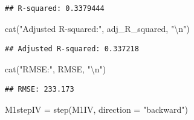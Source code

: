 \documentclass[
]{article}
\newenvironment{Shaded}{\begin{snugshade}}{\end{snugshade}}
\newcommand{\AttributeTok}[1]{\textcolor[rgb]{0.77,0.63,0.00}{#1}}
\newcommand{\FunctionTok}[1]{\textcolor[rgb]{0.00,0.00,0.00}{#1}}
\newcommand{\NormalTok}[1]{#1}
\newcommand{\OtherTok}[1]{\textcolor[rgb]{0.56,0.35,0.01}{#1}}
\newcommand{\SpecialCharTok}[1]{\textcolor[rgb]{0.00,0.00,0.00}{#1}}
\newcommand{\StringTok}[1]{\textcolor[rgb]{0.31,0.60,0.02}{#1}}
\begin{document}
\begin{verbatim}
## R-squared: 0.3379444
\end{verbatim}

\begin{Shaded}
\begin{Highlighting}[]
\FunctionTok{cat}\NormalTok{(}\StringTok{"Adjusted R{-}squared:"}\NormalTok{, adj\_R\_squared, }\StringTok{"}\SpecialCharTok{\textbackslash{}n}\StringTok{"}\NormalTok{)}
\end{Highlighting}
\end{Shaded}

\begin{verbatim}
## Adjusted R-squared: 0.337218
\end{verbatim}

\begin{Shaded}
\begin{Highlighting}[]
\FunctionTok{cat}\NormalTok{(}\StringTok{"RMSE:"}\NormalTok{, RMSE, }\StringTok{"}\SpecialCharTok{\textbackslash{}n}\StringTok{"}\NormalTok{)}
\end{Highlighting}
\end{Shaded}

\begin{verbatim}
## RMSE: 233.173
\end{verbatim}

\begin{Shaded}
\begin{Highlighting}[]
\NormalTok{M1stepIV }\OtherTok{=} \FunctionTok{step}\NormalTok{(M1IV, }\AttributeTok{direction =} \StringTok{"backward"}\NormalTok{)}
\end{Highlighting}
\end{Shaded}
\end{document}
